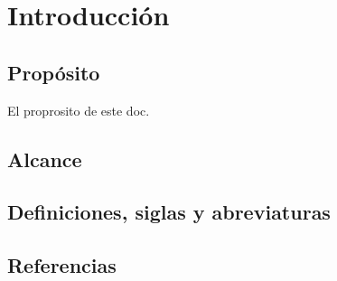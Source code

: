 \chapter{Introducción}

\section{Propósito}
 El proprosito de este doc.
\section{Alcance}

\section{Definiciones, siglas y abreviaturas}

\section{Referencias}